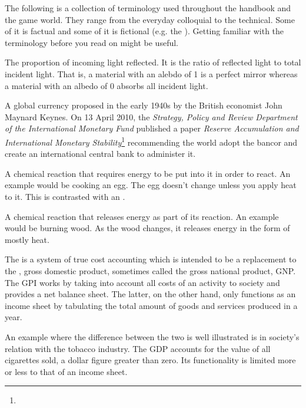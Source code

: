 
The following is a collection of terminology used throughout the handbook and the game world. They range from the everyday colloquial to the technical. Some of it is factual and some of it is fictional (e.g. the {\sl \about[Jenya]}). Getting familiar with the terminology before you read on might be useful.

The proportion of incoming light reflected. It is the ratio of reflected light to total incident light. That is, a material with an alebdo of 1 is a perfect mirror whereas a material with an albedo of 0 absorbs all incident light.

A global currency proposed in the early 1940s by the British economist John Maynard Keynes. On 13 April 2010, the {\sl Strategy, Policy and Review Department of the International Monetary Fund} published a paper {\sl Reserve Accumulation and International Monetary Stability}\footnote{} recommending the world adopt the bancor and create an international central bank to administer it.

A chemical reaction that requires energy to be put into it in order to react. An example would be cooking an egg. The egg doesn't change unless you apply heat to it. This is contrasted with an .

A chemical reaction that releases energy as part of its reaction. An example would be burning wood. As the wood changes, it releases energy in the form of mostly heat.

The  is a system of true cost accounting which is intended to be a replacement to the , gross domestic product, sometimes called the gross national product, GNP. The GPI works by taking into account all costs of an activity to society and provides a net balance sheet. The latter, on the other hand, only functions as an income sheet by tabulating the total amount of goods and services produced in a year. 

An example where the difference between the two is well illustrated is in society's relation with the tobacco industry. The GDP accounts for the value of all cigarettes sold, a dollar figure greater than zero. Its functionality is limited more or less to that of an income sheet.

